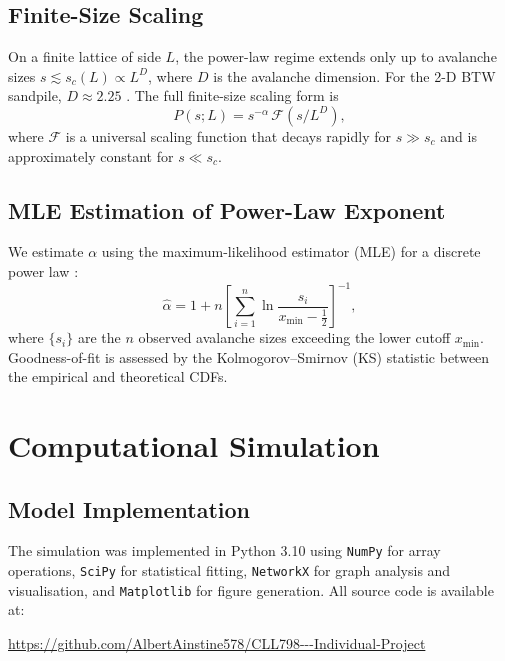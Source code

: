 \documentclass[12pt,a4paper]{article}
\begin{document}
\subsection{Finite-Size Scaling}

On a finite lattice of side $L$, the power-law regime extends only up
to avalanche sizes $s \lesssim s_c(L) \propto L^D$, where $D$ is the
avalanche dimension.  For the 2-D BTW sandpile, $D \approx 2.25$
\cite{lubeck2004}.  The full finite-size scaling form is
\begin{equation}
  P(s; L) = s^{-\alpha}\, \mathcal{F}(s/L^D),
  \label{eq:fss}
\end{equation}
where $\mathcal{F}$ is a universal scaling function that decays rapidly
for $s \gg s_c$ and is approximately constant for $s \ll s_c$.

\subsection{MLE Estimation of Power-Law Exponent}

We estimate $\alpha$ using the maximum-likelihood estimator (MLE) for
a discrete power law \cite{clauset2009}:
\begin{equation}
  \hat{\alpha} = 1 + n \left[ \sum_{i=1}^{n} \ln \frac{s_i}{x_{\min} - \tfrac{1}{2}} \right]^{-1},
  \label{eq:mle}
\end{equation}
where $\{s_i\}$ are the $n$ observed avalanche sizes exceeding the
lower cutoff $x_{\min}$.  Goodness-of-fit is assessed by the
Kolmogorov–Smirnov (KS) statistic between the empirical and
theoretical CDFs.

\section{Computational Simulation}
\label{sec:simulation}

\subsection{Model Implementation}

The simulation was implemented in Python 3.10 using \texttt{NumPy} for
array operations, \texttt{SciPy} for statistical fitting, \texttt{NetworkX}
for graph analysis and visualisation, and \texttt{Matplotlib} for
figure generation.  All source code is available at:

\begin{center}
  \url{https://github.com/AlbertAinstine578/CLL798---Individual-Project}
\end{center}
\end{document}
